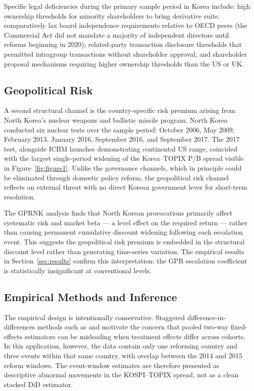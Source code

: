 \documentclass[12pt]{article}
\begin{document}
Specific legal deficiencies during the primary sample period in Korea include: high ownership
thresholds for minority shareholders to bring derivative suits; comparatively lax board
independence requirements relative to OECD peers (the Commercial Act did not mandate a
majority of independent directors until reforms beginning in 2020); related-party transaction
disclosure thresholds that permitted intragroup transactions without shareholder approval; and
shareholder proposal mechanisms requiring higher ownership thresholds than the US or UK.

\subsection{Geopolitical Risk}

A second structural channel is the country-specific risk premium arising from North Korea's
nuclear weapons and ballistic missile program. North Korea conducted six nuclear tests over
the sample period: October 2006, May 2009, February 2013, January 2016, September 2016, and
September 2017. The 2017 test, alongside ICBM launches demonstrating continental US range,
coincided with the largest single-period widening of the Korea--TOPIX P/B spread visible in
Figure~\ref{fig:figure1}. Unlike the governance channels, which in principle could be
eliminated through domestic policy reform, the geopolitical risk channel reflects an external
threat with no direct Korean government lever for short-term resolution.

The \citet{imf2021} GPRNK analysis finds that North Korean provocations primarily affect
systematic risk and market beta --- a level effect on the required return --- rather than
causing permanent cumulative discount widening following each escalation event. This suggests
the geopolitical risk premium is embedded in the structural discount level rather than
generating time-series variation. The empirical results in Section~\ref{sec:results} confirm
this interpretation: the GPR escalation coefficient is statistically insignificant at
conventional levels.

\subsection{Empirical Methods and Inference}

The empirical design is intentionally conservative. Staggered difference-in-differences
methods such as \citet{cengiz2019} and \citet{baker2022} motivate the concern that pooled
two-way fixed-effects estimators can be misleading when treatment effects differ across
cohorts. In this application, however, the data contain only one reforming country and three
events within that same country, with overlap between the 2014 and 2015 reform windows. The
event-window estimates are therefore presented as descriptive abnormal movements in the
KOSPI--TOPIX spread, not as a clean stacked DiD estimator.
\end{document}
